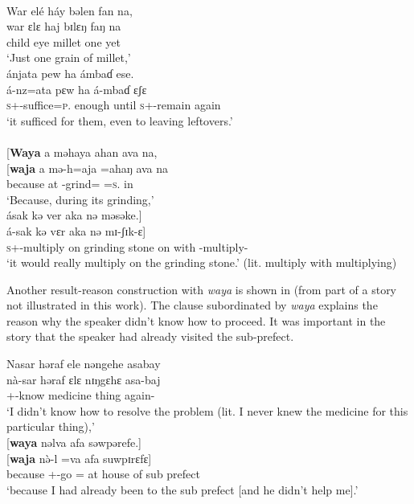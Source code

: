 \ea \label{ex:12:35}
\\
War  elé  háy  bəlen  fan  na,\\  
\gll  war ɛlɛ haj bɪlɛŋ faŋ na\\ 
      child   eye   millet   one    yet   {\PSP}\\     
\glt ‘Just one grain of millet,’\\

\medskip
ánjata  pew  ha  ámbaɗ  ese.\\  
\gll á-nz=ata pɛw ha á-mbaɗ ɛʃɛ \\ 
     \textsc{s}+{\IFV}-suffice=\textsc{p}.{\IO} enough   until  \textsc{s}+{\IFV}-remain   again \\
\glt ‘it sufficed for them, even to leaving leftovers.’\\

\medskip{}\\\relax
{}[\textbf{Waya}  a  məhaya  ahan  ava  na,\\  
\gll {}[\textbf{waja}  a mə-h=aja =ahaŋ ava na\\ 
     because  at   {\NOM}{}-grind={\PLU}   =\textsc{s}.{\POSS}   in   {\PSP}  \\ 
\glt ‘Because, during its grinding,’\\

\medskip
ásak  kə  ver  aka  nə  məsəke.]\\
\gll á-sak kə vɛr aka nə mɪ-ʃɪk-ɛ]\\
     \textsc{s}+{\IFV}-multiply   on   {grinding stone}    on    with   {\NOM}{}-multiply-{\CL}\\
\glt  ‘it would really multiply on the grinding stone.’ (lit. multiply with multiplying)  
\z 

Another result-reason construction with \textit{waya} is shown in  (from part of a story not illustrated in this work).  The clause subordinated by \textit{waya} explains the reason why the speaker didn’t know how to proceed. It was important in the story that the speaker had already visited the sub-prefect.

\ea \label{ex:12:36}
Nasar  həraf  ele  nəngehe  asabay\\  
\gll  nà-sar    həraf    ɛlɛ  nɪŋgɛhɛ  asa-baj \\
      {\oneS}+{\PFV}-know  medicine   thing  {\DEM}  again-{\NEG} \\ 
\glt ‘I didn’t know how to resolve the problem (lit. I never knew the medicine for this particular thing),’\\
\clearpage
\medskip
{}[\textbf{waya} nəlva  afa  səwpərefe.]\\
\gll {}[\textbf{waja} n\`{ə}-l  =va afa suwpɪrɛfɛ]\\
     because  {\oneS}+{\PFV}-go  ={\PRF}    {at house of}    {sub prefect}\\
\glt  ‘because I had already been to the sub prefect [and he didn’t help me].’ 
\z 

